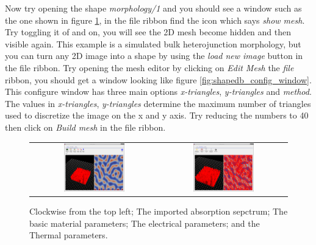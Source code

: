 Now try opening the shape \emph{morphology/1} and you should see a window such as the one shown in figure \ref{fig:shape_examples01}, in the file ribbon find the icon which says \emph{show mesh}.  Try toggling it of and on, you will see the 2D mesh become hidden and then visible again.  This example is a simulated bulk heterojunction morphology, but you can turn any 2D image into a shape by using the \emph{load new image} button in the file ribbon.  Try opening the mesh editor by clicking on \emph{Edit Mesh} the \emph{file} ribbon, you should get a window looking like figure \ref{fig:shapedb_config_window}. This configure window has three main options \emph{x-triangles}, \emph{y-triangles} and \emph{method}.  The values in \emph{x-triangles}, \emph{y-triangles} determine the maximum number of triangles used to discretize the image on the x and y axis.  Try reducing the numbers to 40 then click on \emph{Build mesh} in the file ribbon.

\begin{figure}[H]
\centering
\begin{tabular}{ c c }

\includegraphics[width=0.5\textwidth,height=0.4\textwidth]{./images/database_shapes/example0.png}

&
\includegraphics[width=0.5\textwidth,height=0.4\textwidth]{./images/database_shapes/example1.png}
\\
\end{tabular}
\caption{Clockwise from the top left; The imported absorption sepctrum; The basic material parameters; The electrical parameters; and the Thermal parameters.}
\label{fig:shape_examples01}
\end{figure}

